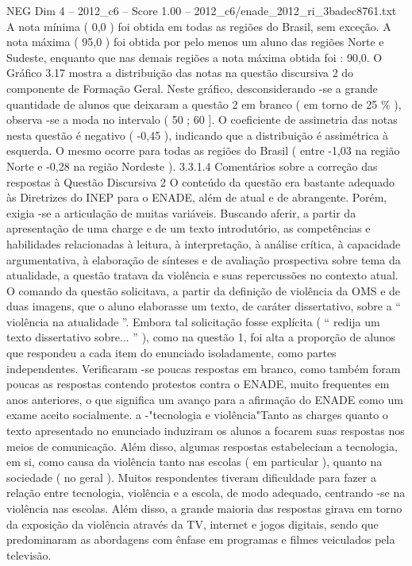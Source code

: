 \begin{textsample}{NEG Dim 4 – 2012\_c6 – Score 1.00 – 2012\_c6/enade\_2012\_ri\_3badec8761.txt}
A nota mínima ( 0,0 ) foi obtida em todas as regiões do Brasil, sem exceção.
A nota máxima ( 95,0 ) foi obtida por pelo menos um aluno das regiões Norte e Sudeste, enquanto que nas demais regiões a nota máxima obtida foi : 90,0.
O Gráfico 3.17 mostra a distribuição das notas na questão discursiva 2 do componente de Formação Geral.
Neste gráfico, desconsiderando -se a grande quantidade de alunos que deixaram a questão 2 em branco ( em torno de 25 \% ), observa -se a moda no intervalo ( 50 ; 60 ].
O coeficiente de assimetria das notas nesta questão é negativo ( -0,45 ), indicando que a distribuição é assimétrica à esquerda.
O mesmo ocorre para todas as regiões do Brasil ( entre -1,03 na região Norte e -0,28 na região Nordeste ). 3.3.1.4 Comentários sobre a correção das respostas à Questão Discursiva 2 O conteúdo da questão era bastante adequado às Diretrizes do INEP para o ENADE, além de atual e de abrangente.
Porém, exigia -se a articulação de muitas variáveis.
Buscando aferir, a partir da apresentação de uma charge e de um texto introdutório, as competências e habilidades relacionadas à leitura, à interpretação, à análise crítica, à capacidade argumentativa, à elaboração de sínteses e de avaliação prospectiva sobre tema da atualidade, a questão tratava da violência e suas repercussões no contexto atual.
O comando da questão solicitava, a partir da definição de violência da OMS e de duas imagens, que o aluno elaborasse um texto, de caráter dissertativo, sobre a “ violência na atualidade ”.
Embora tal solicitação fosse explícita ( “ redija um texto dissertativo sobre... ” ), como na questão 1, foi alta a proporção de alunos que respondeu a cada item do enunciado isoladamente, como partes independentes.
Verificaram -se poucas respostas em branco, como também foram poucas as respostas contendo protestos contra o ENADE, muito frequentes em anos anteriores, o que significa um avanço para a afirmação do ENADE como um exame aceito socialmente. a -"tecnologia e violência"Tanto as charges quanto o texto apresentado no enunciado induziram os alunos a focarem suas respostas nos meios de comunicação.
Além disso, algumas respostas estabeleciam a tecnologia, em si, como causa da violência tanto nas escolas ( em particular ), quanto na sociedade ( no geral ).
Muitos respondentes tiveram dificuldade para fazer a relação entre tecnologia, violência e a escola, de modo adequado, centrando -se na violência nas escolas.
Além disso, a grande maioria das respostas girava em torno da exposição da violência através da TV, internet e jogos digitais, sendo que predominaram as abordagens com ênfase em programas e filmes veiculados pela televisão.

\end{textsample}
